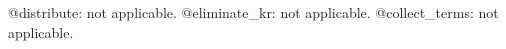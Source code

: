 \documentclass[11pt]{article}
\begin{document}
@distribute: not applicable.
@eliminate\_kr: not applicable.
@collect\_terms: not applicable.
\end{document}
